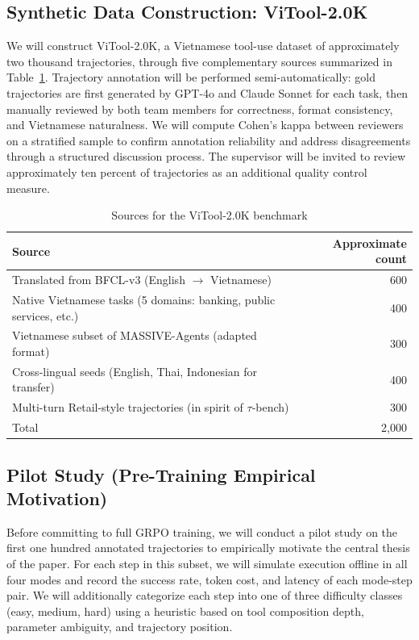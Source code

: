 \documentclass[11pt,a4paper]{article}
\begin{document}
\subsection{Synthetic Data Construction: ViTool-2.0K}

We will construct ViTool-2.0K, a Vietnamese tool-use dataset of approximately two thousand trajectories, through five complementary sources summarized in Table~\ref{tab:dataset_sources}. Trajectory annotation will be performed semi-automatically: gold trajectories are first generated by GPT-4o and Claude Sonnet for each task, then manually reviewed by both team members for correctness, format consistency, and Vietnamese naturalness. We will compute Cohen's kappa between reviewers on a stratified sample to confirm annotation reliability and address disagreements through a structured discussion process. The supervisor will be invited to review approximately ten percent of trajectories as an additional quality control measure.

\begin{table}[h]
\caption{Sources for the ViTool-2.0K benchmark}
\label{tab:dataset_sources}
\centering
\begin{tabular}{lr}
\toprule
Source & Approximate count \\
\midrule
Translated from BFCL-v3 (English $\to$ Vietnamese) & 600 \\
Native Vietnamese tasks (5 domains: banking, public services, etc.) & 400 \\
Vietnamese subset of MASSIVE-Agents (adapted format) & 300 \\
Cross-lingual seeds (English, Thai, Indonesian for transfer) & 400 \\
Multi-turn Retail-style trajectories (in spirit of $\tau$-bench) & 300 \\
\midrule
Total & 2{,}000 \\
\bottomrule
\end{tabular}
\end{table}

\subsection{Pilot Study (Pre-Training Empirical Motivation)}

Before committing to full GRPO training, we will conduct a pilot study on the first one hundred annotated trajectories to empirically motivate the central thesis of the paper. For each step in this subset, we will simulate execution offline in all four modes and record the success rate, token cost, and latency of each mode-step pair. We will additionally categorize each step into one of three difficulty classes (easy, medium, hard) using a heuristic based on tool composition depth, parameter ambiguity, and trajectory position.
\end{document}
